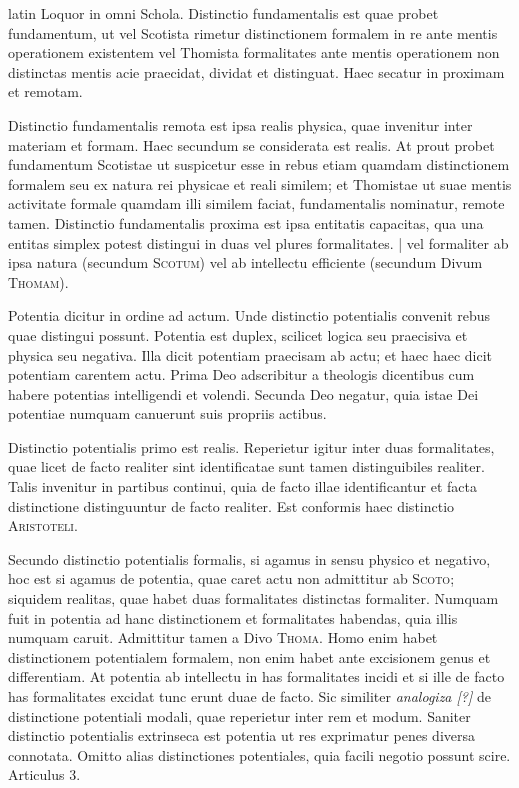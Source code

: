 \begin{otherlanguage*}{latin}
\pstart
 Loquor in omni Schola. Distinctio fundamentalis est quae probet fundamentum, ut vel Scotista rimetur distinctionem formalem in re ante mentis operationem existentem vel Thomista formalitates ante mentis operationem non distinctas mentis acie praecidat, dividat et distinguat. Haec secatur in proximam et remotam. 
\pend

\pstart
 Distinctio fundamentalis remota est ipsa realis physica, quae invenitur inter materiam et formam. Haec secundum se considerata est realis. Αt prout probet fundamentum Scotistae ut suspicetur esse in rebus etiam quamdam distinctionem formalem seu ex natura rei physicae et reali similem; et Thomistae ut suae mentis activitate formale quamdam illi similem faciat, fundamentalis nominatur, remote tamen. Distinctio fundamentalis proxima est ipsa entitatis capacitas, qua una entitas simplex potest distingui in duas vel plures formalitates. \textnormal{|} vel formaliter ab ipsa natura (secundum \textsc{Scotum}) vel ab intellectu efficiente (secundum Divum \textsc{Thomam}). 
\pend

\pstart
 Potentia dicitur in ordine ad actum. Unde distinctio potentialis convenit rebus quae distingui possunt. Potentia est duplex, scilicet logica seu praecisiva et physica seu negativa. Illa dicit potentiam praecisam ab actu; et haec haec dicit potentiam carentem actu. Prima Deo adscribitur a theologis dicentibus cum habere potentias intelligendi et volendi. Secunda Deo negatur, quia istae Dei potentiae numquam canuerunt suis propriis actibus. 
\pend

\pstart
 Distinctio potentialis primo est realis. Reperietur igitur inter duas formalitates, quae licet de facto realiter sint identificatae sunt tamen distinguibiles realiter. Talis invenitur in partibus continui, quia de facto illae identificantur et facta distinctione distinguuntur de facto realiter. Est conformis haec distinctio \textsc{Aristoteli}. 
\pend

\pstart
 Secundo distinctio potentialis formalis, si agamus in sensu physico et negativo, hoc est si agamus de potentia, quae caret actu non admittitur ab \textsc{Scoto}; siquidem realitas, quae habet duas formalitates distinctas formaliter. Numquam fuit in potentia ad hanc distinctionem et formalitates habendas, quia illis numquam caruit. Admittitur tamen a Divo \textsc{Thoma}. Homo enim habet distinctionem potentialem formalem, non enim habet ante excisionem genus et differentiam. At potentia ab intellectu in has formalitates incidi et si ille de facto has formalitates excidat tunc erunt duae de facto. Sic similiter \emph{analogiza [?]} de distinctione potentiali modali, quae reperietur inter rem et modum. Saniter distinctio potentialis extrinseca est potentia ut res exprimatur penes diversa connotata. Omitto alias distinctiones potentiales, quia facili negotio possunt scire. Articulus 3. 
\pend


\end{otherlanguage*}
